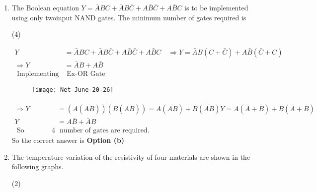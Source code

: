 \begin{enumerate}
 \begin{tasks}(4)
\end{tasks}
\begin{answer}
	\begin{align*}
	\begin{array}{|ccc|c}
	\cline{1-3} Q_{3} & Q_{3} & Q_{1}& \\
	\cline{1-3} 0 & 0 & 1 &(1)\\
	\cline{1-3} 0 & 1 & 1 &(2)\\
	\cline{1-3}
	\end{array}
	\end{align*}
	So the correct answer is \textbf{Option (c)}
\end{answer}
\item The Boolean equation $Y=\bar{A} B C+\bar{A} B \bar{C}+A \bar{B} \bar{C}+A \bar{B} C$ is to be implemented using only twoinput NAND gates. The minimum number of gates required is
 \begin{tasks}(4)
\end{tasks}
\begin{answer}
	\begin{align*}
	Y&=\bar{A} B C+\bar{A} B \bar{C}+A \bar{B} \bar{C}+A \bar{B} C \quad \Rightarrow Y=\bar{A} B(C+\bar{C})+A \bar{B}(\bar{C}+C)\\
	\Rightarrow Y&=\bar{A} B+A \bar{B}\\
	\text { Implementing}&\text{ Ex-OR Gate }
	\end{align*}
	\begin{figure}[H]
		\centering
		\texttt{[image: Net-June-20-26]}
	\end{figure}
	\begin{align*}
	\Rightarrow Y&=\overline{(A(\overline{A B}))(B(\overline{A B}))}=\overline{A(\overline{A B})}+\overline{B(\overline{A B})} Y=A(\bar{A}+\bar{B})+B(\bar{A}+\bar{B}) \\
	Y&=A \bar{B}+\bar{A} B\\
	\text { So minimum } 4& \text { number of gates are required. }
	\end{align*}
		So the correct answer is \textbf{Option (b)}
\end{answer}
\item  The temperature variation of the resistivity of four materials are shown in the following graphs.
 \begin{tasks}(2)

\end{tasks}
\end{enumerate}
